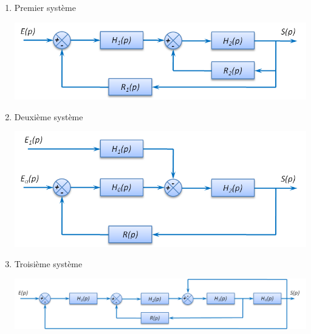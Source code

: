 \begin{enumerate}
\item Premier système
\begin{center}
\includegraphics[width=.7\textwidth]{png/fig_04}
\end{center}
\item Deuxième système
\begin{center}
\includegraphics[width=.7\textwidth]{png/fig_05}
\end{center}
\item Troisième système
\begin{center}
\includegraphics[width=\textwidth]{png/fig_06}
\end{center}
\end{enumerate}

